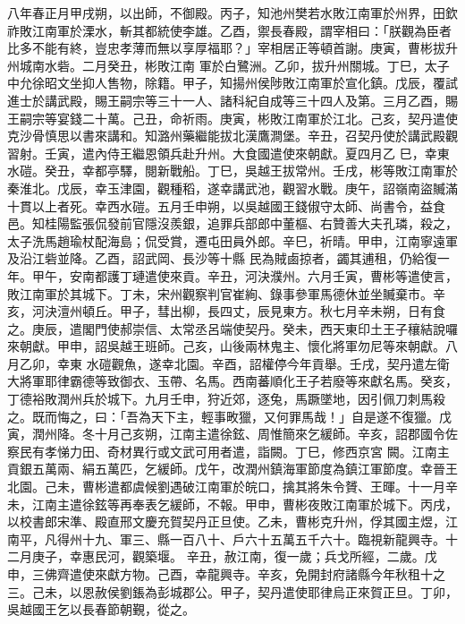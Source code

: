 \begin{pinyinscope}
 八年春正月甲戌朔，以出師，不御殿。丙子，知池州樊若水敗江南軍於州界，田欽祚敗江南軍於溧水，斬其都統使李雄。乙酉，禦長春殿，謂宰相曰：「朕觀為臣者比多不能有終，豈忠孝薄而無以享厚福耶？」宰相居正等頓首謝。庚寅，曹彬拔升州城南水砦。二月癸丑，彬敗江南
 軍於白鷺洲。乙卯，拔升州關城。丁巳，太子中允徐昭文坐抑人售物，除籍。甲子，知揚州侯陟敗江南軍於宣化鎮。戊辰，覆試進士於講武殿，賜王嗣宗等三十一人、諸科紀自成等三十四人及第。三月乙酉，賜王嗣宗等宴錢二十萬。己丑，命祈雨。庚寅，彬敗江南軍於江北。己亥，契丹遣使克沙骨慎思以書來講和。知潞州藥繼能拔北漢鷹澗堡。辛丑，召契丹使於講武殿觀習射。壬寅，遣內侍王繼恩領兵赴升州。大食國遣使來朝獻。夏四月乙
 巳，幸東水磑。癸丑，幸都亭驛，閱新戰船。丁巳，吳越王拔常州。壬戌，彬等敗江南軍於秦淮北。戊辰，幸玉津園，觀種稻，遂幸講武池，觀習水戰。庚午，詔嶺南盜贓滿十貫以上者死。幸西水磑。五月壬申朔，以吳越國王錢俶守太師、尚書令，益食邑。知桂陽監張侃發前官隱沒羨銀，追罪兵部郎中董樞、右贊善大夫孔璘，殺之，太子洗馬趙瑜杖配海島；侃受賞，遷屯田員外郎。辛巳，祈晴。甲申，江南寧遠軍及沿江砦並降。乙酉，詔武岡、長沙等十縣
 民為賊鹵掠者，蠲其逋租，仍給復一年。甲午，安南都護丁璉遣使來貢。辛丑，河決濮州。六月壬寅，曹彬等遣使言，敗江南軍於其城下。丁未，宋州觀察判官崔絢、錄事參軍馬德休並坐贓棄市。辛亥，河決澶州頓丘。甲子，彗出柳，長四丈，辰見東方。秋七月辛未朔，日有食之。庚辰，遣閣門使郝崇信、太常丞呂端使契丹。癸未，西天東印土王子穰結說囉來朝獻。甲申，詔吳越王班師。己亥，山後兩林鬼主、懷化將軍勿尼等來朝獻。八月乙卯，幸東
 水磑觀魚，遂幸北園。辛酉，詔權停今年貢舉。壬戌，契丹遣左衛大將軍耶律霸德等致御衣、玉帶、名馬。西南蕃順化王子若廢等來獻名馬。癸亥，丁德裕敗潤州兵於城下。九月壬申，狩近郊，逐兔，馬蹶墜地，因引佩刀刺馬殺之。既而悔之，曰：「吾為天下主，輕事畋獵，又何罪馬哉！」自是遂不復獵。戊寅，潤州降。冬十月己亥朔，江南主遣徐鉉、周惟簡來乞緩師。辛亥，詔郡國令佐察民有孝悌力田、奇材異行或文武可用者遣，詣闕。丁巳，修西京宮
 闕。江南主貢銀五萬兩、絹五萬匹，乞緩師。戊午，改潤州鎮海軍節度為鎮江軍節度。幸晉王北園。己未，曹彬遣都虞候劉遇破江南軍於皖口，擒其將朱令贇、王暉。十一月辛未，江南主遣徐鉉等再奉表乞緩師，不報。甲申，曹彬夜敗江南軍於城下。丙戌，以校書郎宋準、殿直邢文慶充賀契丹正旦使。乙未，曹彬克升州，俘其國主煜，江南平，凡得州十九、軍三、縣一百八十、戶六十五萬五千六十。臨視新龍興寺。十二月庚子，幸惠民河，觀築堰。
 辛丑，赦江南，復一歲；兵戈所經，二歲。戊申，三佛齊遣使來獻方物。己酉，幸龍興寺。辛亥，免開封府諸縣今年秋租十之三。己未，以恩赦侯劉鋹為彭城郡公。甲子，契丹遣使耶律烏正來賀正旦。丁卯，吳越國王乞以長春節朝覲，從之。




\end{pinyinscope}
